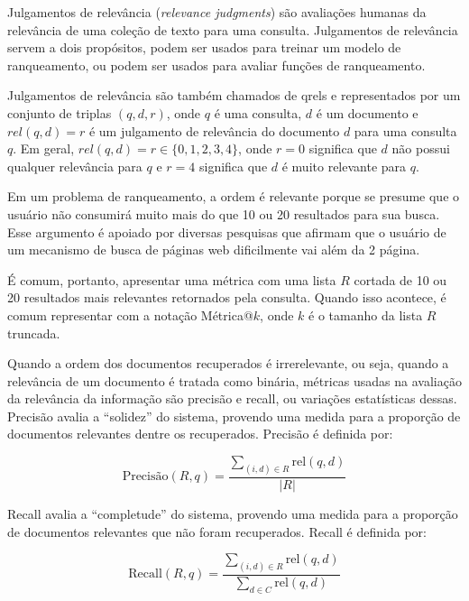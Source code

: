 \documentclass[
	12pt,				%
	openright,			%
	oneside,			%
	a4paper,			%
	english,			%
	french,				%
	spanish,			%
	brazil				%
	]{abntex2}
\begin{document}
Julgamentos de relevância (\textit{relevance judgments}) são avaliações humanas da relevância de uma coleção de texto para uma consulta.
Julgamentos de relevância servem a dois propósitos, podem ser usados para treinar um modelo de ranqueamento,
ou podem ser usados para avaliar funções de ranqueamento. \cite{}

Julgamentos de relevância são também chamados de qrels e representados por um conjunto de triplas $(q, d, r)$, onde $q$ é uma consulta, $d$ é um documento e $rel(q, d) = r$
é um julgamento de relevância do documento $d$ para uma consulta $q$.
Em geral, $rel(q, d) = r \in \{0, 1, 2, 3, 4\}$, onde $r = 0$ significa que $d$ não possui qualquer relevância para $q$ e $r = 4$ significa que
$d$ é muito relevante para $q$.

Em um problema de ranqueamento, a ordem é relevante porque se presume que o usuário não consumirá muito mais do que
10 ou 20 resultados para sua busca.
Esse argumento é apoiado por diversas pesquisas que afirmam que o usuário de um mecanismo de busca de páginas web dificilmente vai além da 2 página. \cite{}

É comum, portanto, apresentar uma métrica com uma lista $R$ cortada de 10 ou 20 resultados mais relevantes retornados pela consulta.
Quando isso acontece, é comum representar com a notação Métrica@$k$, onde $k$ é o tamanho da lista $R$ truncada. \cite{}

Quando a ordem dos documentos recuperados é irrerelevante,
ou seja, quando a relevância de um documento é tratada como binária,
métricas usadas na avaliação da relevância da
informação são precisão e recall, ou variações estatísticas dessas.
Precisão avalia a ``solidez'' do sistema, provendo uma medida para a proporção de documentos relevantes dentre os
recuperados. Precisão é definida por:

\begin{equation}
    \text{Precisão}(R,q) = \frac{\sum_{(i,d)\in R} \text{rel}(q,d)}{|R|}
\end{equation}

Recall avalia a ``completude'' do sistema, provendo uma medida para a proporção de documentos relevantes que não
foram recuperados. Recall é definida por:

\begin{equation}
    \text{Recall}(R,q) = \frac{\sum_{(i,d)\in R} \text{rel}(q,d)}{\sum_{d\in C} \text{rel}(q,d)}
\end{equation}
\end{document}

